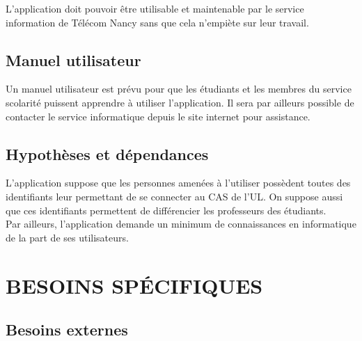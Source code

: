 \documentclass{scrreprt}
\begin{document}
\hspace{0.6cm}L'application doit pouvoir être utilisable et maintenable par le service information de Télécom Nancy sans que cela n'empiète sur leur travail.


\section{Manuel utilisateur}
\hspace{1cm}Un manuel utilisateur est prévu pour que les étudiants et les membres du service scolarité puissent apprendre à utiliser l'application. Il sera par ailleurs possible de contacter le service informatique depuis le site internet pour assistance.


\section{Hypothèses et dépendances}
\hspace{1cm}L'application suppose que les personnes amenées à l'utiliser possèdent toutes des identifiants leur permettant de se connecter au CAS de l'UL. On suppose aussi que ces identifiants permettent de différencier les professeurs des étudiants.\\

\hspace{1cm}Par ailleurs, l'application demande un minimum de connaissances en informatique de la part de ses utilisateurs.


\chapter{BESOINS SPÉCIFIQUES}

\section{Besoins externes}
\end{document}
